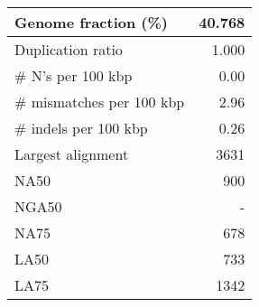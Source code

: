 \documentclass[12pt,a4paper]{article}
\begin{document}
\begin{table}[ht]
\begin{center}
\begin{tabular}{|l*{1}{|r}|}
Genome fraction (\%) & 40.768 \\ \hline
Duplication ratio & 1.000 \\ \hline
\# N's per 100 kbp & 0.00 \\ \hline
\# mismatches per 100 kbp & 2.96 \\ \hline
\# indels per 100 kbp & 0.26 \\ \hline
Largest alignment & 3631 \\ \hline
NA50 & 900 \\ \hline
NGA50 & - \\ \hline
NA75 & 678 \\ \hline
LA50 & 733 \\ \hline
LA75 & 1342 \\ \hline
\end{tabular}
\end{center}
\end{table}
\end{document}
